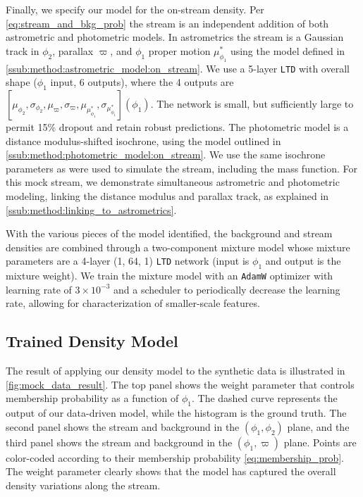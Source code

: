 \documentclass[twocolumn, linenumbers]{aastex631}
\newcommand{\parallax}{\varpi}
\begin{document}
        Finally, we specify our model for the on-stream density. Per \autoref{eq:stream_and_bkg_prob} the stream is an independent
        addition of both astrometric and photometric models.  In astrometrics
        the stream is a Gaussian track in $\phi_2$, parallax $\parallax$, and $\phi_1$ proper motion $\mu_{\phi_1}^*$
        using the model defined in
        \autoref{ssub:method:astrometric_model:on_stream}.  We use a 5-layer
        \texttt{LTD} with overall shape ($\phi_1$ input, 6 outputs), where the 4
        outputs are $[\mu_{\phi_2}, \sigma_{\phi_2}, \mu_{\parallax},
        \sigma_{\parallax}, \mu_{\mu_{\phi_1}^*},
        \sigma_{\mu_{\phi_1}^*}](\phi_1)$.  The network is small, but sufficiently
        large to permit 15\% dropout and retain robust predictions.  The
        photometric model is a distance modulus-shifted isochrone, using the
        model outlined in  \autoref{ssub:method:photometric_model:on_stream}. We
        use the same isochrone parameters as were used to simulate the stream,
        including the \citet{GrillmairSmith2001} mass function.  For this mock
        stream, we demonstrate simultaneous astrometric and photometric
        modeling, linking the distance modulus and parallax track, as explained
        in \autoref{ssub:method:linking_to_astrometrics}.

        
        With the various pieces of the model identified, the background and stream densities are combined through a two-component mixture model
        whose mixture parameters are a 4-layer (1, 64, 1) \texttt{LTD} network (input is $\phi_1$ and output is the mixture weight).
        We train the mixture model with an \texttt{AdamW} optimizer with
        learning rate of $3\times10^{-3}$ and a scheduler to periodically decrease the learning rate, allowing for characterization of smaller-scale features.

    \subsection{Trained Density Model} \label{sub:results_mock:results}

        The result of applying our density model to the synthetic data is
        illustrated in \autoref{fig:mock_data_result}. The top panel shows the
        weight parameter that controls membership probability as a function of
        $\phi_1$. The dashed curve represents the output of our data-driven
        model, while the histogram is the ground truth. The second panel shows
        the stream and background in the $(\phi_1,\phi_2)$ plane, and the third
        panel shows the stream and background in the $(\phi_1,\parallax)$ plane.
        Points are color-coded according to their membership probability
        \autoref{eq:membership_prob}. The weight parameter clearly shows that
        the model has captured the overall density variations along the
        stream.
\end{document}
